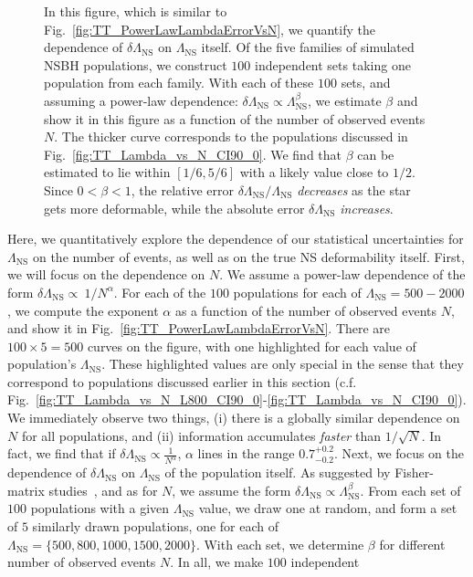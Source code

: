 \documentclass[aps,prd,amsmath,floats,floatfix, twocolumn,
superscriptaddress,nofootinbib,showpacs]{revtex4-1}
\newcommand{\lambdans}{\Lambda_\mathrm{NS}}
\begin{document}
\begin{appendix}
\begin{figure}
\caption{%
In this figure, which is similar to Fig.~\ref{fig:TT_PowerLawLambdaErrorVsN},
we quantify the dependence of $\delta\lambdans$ on $\lambdans$ itself. Of 
the five families of simulated NSBH populations, we construct $100$
independent sets taking one population from each family. With each of 
these $100$ sets, and assuming a power-law dependence:
$\delta\lambdans\propto\lambdans^\beta$, we estimate $\beta$ and show it in
this figure as a function of the number of observed events $N$. The thicker
curve corresponds to the populations discussed in
Fig.~\ref{fig:TT_Lambda_vs_N_CI90_0}.
% 
We find that $\beta$ can be estimated to lie within $[1/6,5/6]$ with a
likely value close to $1/2$. Since $0<\beta<1$, the relative error
$\delta\lambdans/\lambdans$ {\it decreases} as the star gets more 
deformable, while the absolute error $\delta\lambdans$ {\it increases}.
}
\label{fig:TT_PowerLawLambdaErrorVsLambda}
\end{figure}
% 
Here, we quantitatively explore the dependence of our statistical
uncertainties for $\lambdans$ on the number of events, as well as on the true
NS deformability itself. First, we will focus on the dependence on $N$. We
assume a power-law dependence of the form
$\delta\lambdans\propto\ 1/N^\alpha$. For each of the $100$ populations 
for each of $\lambdans=500-2000$, we compute the exponent $\alpha$ as a
function of the number of observed events $N$, and show it in 
Fig.~\ref{fig:TT_PowerLawLambdaErrorVsN}. There are $100\times5=500$ curves
on the figure, with one highlighted for each value of population's $\lambdans$.
These highlighted values are only special in the sense that they correspond to
populations discussed earlier in this section (c.f.
Fig.~\ref{fig:TT_Lambda_vs_N_L800_CI90_0}-\ref{fig:TT_Lambda_vs_N_CI90_0}).
We immediately observe two things, (i) there is a globally similar dependence
on $N$ for all populations, and (ii) information accumulates {\it faster} than
$1/\sqrt{N}$. In fact, we find that if
$\delta\lambdans\propto\frac{1}{N^\alpha}$, $\alpha$ lines in the range
$0.7_{-0.2}^{+0.2}$.
% 
Next, we focus on the dependence of $\delta\lambdans$ on $\lambdans$ of the
population itself. As suggested by Fisher-matrix studies~\cite{Lackey:2013axa},
and as for $N$, we assume the form $\delta\lambdans\propto\lambdans^\beta$.
From each set of $100$ populations with a given $\lambdans$ value, we draw one
at random, and form a set of $5$ similarly drawn populations, one for each of
$\lambdans=\{500,800,1000,1500,2000\}$. With each set, we determine $\beta$
for different number of observed events $N$. In all, we make $100$ independent

\end{appendix}
\end{document}
